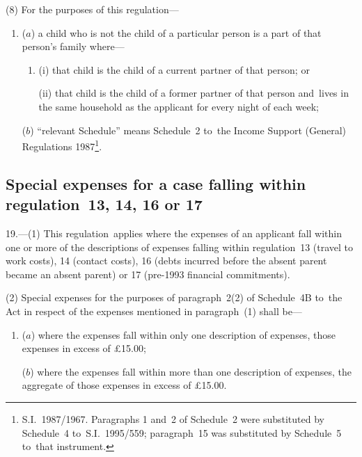\documentclass[12pt,a4paper]{article}
\begin{document}
(8) For the purposes of this regulation—
\begin{enumerate}\item[]

($a$) a child who is not the child of a particular person is a part of that person’s family where—
\begin{enumerate}\item[]
(i) that child is the child of a current partner of that person; or

(ii) that child is the child of a former partner of that person and~lives in the same household as the applicant for every night of each week;
\end{enumerate}

($b$) “relevant Schedule” means Schedule~2 to~the Income Support (General)
Regulations 1987\footnote{\frenchspacing S.I.~1987/1967. Paragraphs 1 and~2 of Schedule~2 were substituted by Schedule~4 to~S.I.~1995/559; paragraph~15 was substituted by Schedule~5 to~that instrument.}.
\end{enumerate}


\subsection[19. Special expenses for a case falling within regulation~13, 14, 16 or 17]{Special expenses for a case falling within regulation~13, 14, 16 or 17}

19.—(1)
This regulation~applies where the expenses of an applicant fall within one or
more of the descriptions of expenses falling within regulation~13 (travel to
work costs), 14 (contact costs), 16 (debts incurred before the absent parent
became an absent parent) or 17 (pre-1993 financial commitments).

(2) Special expenses for the purposes of paragraph~2(2) of Schedule~4B to~the
Act in respect of the expenses mentioned in paragraph~(1) shall be—
\begin{enumerate}\item[]
($a$) where the expenses fall within only one description of expenses, those
expenses in excess of £15.00;

($b$) where the expenses fall within more than one description of expenses, the
aggregate of those expenses in excess of £15.00.
\end{enumerate}
\end{document}
